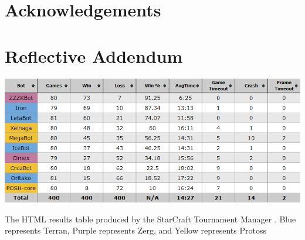 \documentclass[journal]{IEEEtran}
\begin{document}
\section{Acknowledgements}





\section{Reflective Addendum}

\appendix
\begin{table}[]
	\centering
	\includegraphics[width=\textwidth]{STMResultsWithBot}
	\caption{The HTML results table produced by the StarCraft Tournament Manager \cite{Tournament}. Blue represents Terran, Purple represents Zerg, and Yellow represents Protoss}
	\label{Table2}
\end{table}
\end{document}
